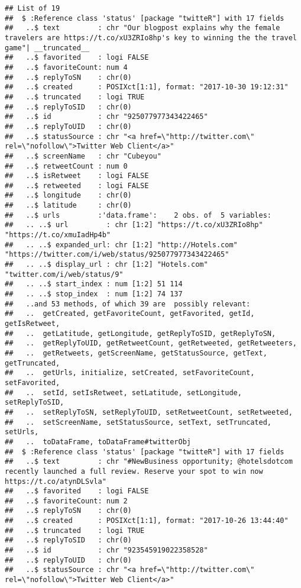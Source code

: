 \documentclass[]{article}
\begin{document}
\begin{verbatim}
## List of 19
##  $ :Reference class 'status' [package "twitteR"] with 17 fields
##   ..$ text         : chr "Our blogpost explains why the female travelers are https://t.co/xU3ZRIo8hp's key to winning the the travel game"| __truncated__
##   ..$ favorited    : logi FALSE
##   ..$ favoriteCount: num 4
##   ..$ replyToSN    : chr(0) 
##   ..$ created      : POSIXct[1:1], format: "2017-10-30 19:12:31"
##   ..$ truncated    : logi TRUE
##   ..$ replyToSID   : chr(0) 
##   ..$ id           : chr "925077977343422465"
##   ..$ replyToUID   : chr(0) 
##   ..$ statusSource : chr "<a href=\"http://twitter.com\" rel=\"nofollow\">Twitter Web Client</a>"
##   ..$ screenName   : chr "Cubeyou"
##   ..$ retweetCount : num 0
##   ..$ isRetweet    : logi FALSE
##   ..$ retweeted    : logi FALSE
##   ..$ longitude    : chr(0) 
##   ..$ latitude     : chr(0) 
##   ..$ urls         :'data.frame':    2 obs. of  5 variables:
##   .. ..$ url         : chr [1:2] "https://t.co/xU3ZRIo8hp" "https://t.co/xmuIadHp4b"
##   .. ..$ expanded_url: chr [1:2] "http://Hotels.com" "https://twitter.com/i/web/status/925077977343422465"
##   .. ..$ display_url : chr [1:2] "Hotels.com" "twitter.com/i/web/status/9"
##   .. ..$ start_index : num [1:2] 51 114
##   .. ..$ stop_index  : num [1:2] 74 137
##   ..and 53 methods, of which 39 are  possibly relevant:
##   ..  getCreated, getFavoriteCount, getFavorited, getId, getIsRetweet,
##   ..  getLatitude, getLongitude, getReplyToSID, getReplyToSN,
##   ..  getReplyToUID, getRetweetCount, getRetweeted, getRetweeters,
##   ..  getRetweets, getScreenName, getStatusSource, getText, getTruncated,
##   ..  getUrls, initialize, setCreated, setFavoriteCount, setFavorited,
##   ..  setId, setIsRetweet, setLatitude, setLongitude, setReplyToSID,
##   ..  setReplyToSN, setReplyToUID, setRetweetCount, setRetweeted,
##   ..  setScreenName, setStatusSource, setText, setTruncated, setUrls,
##   ..  toDataFrame, toDataFrame#twitterObj
##  $ :Reference class 'status' [package "twitteR"] with 17 fields
##   ..$ text         : chr "#NewBusiness opportunity; @hotelsdotcom recently launched a full review. Reserve your spot to win now https://t.co/atynDLSvla"
##   ..$ favorited    : logi FALSE
##   ..$ favoriteCount: num 2
##   ..$ replyToSN    : chr(0) 
##   ..$ created      : POSIXct[1:1], format: "2017-10-26 13:44:40"
##   ..$ truncated    : logi TRUE
##   ..$ replyToSID   : chr(0) 
##   ..$ id           : chr "923545919022358528"
##   ..$ replyToUID   : chr(0) 
##   ..$ statusSource : chr "<a href=\"http://twitter.com\" rel=\"nofollow\">Twitter Web Client</a>"

\end{verbatim}
\end{document}
